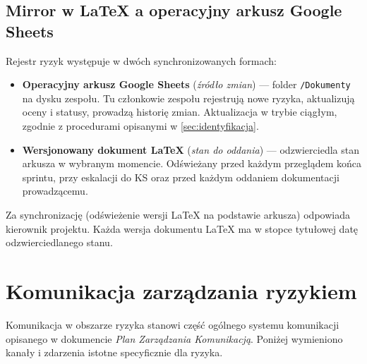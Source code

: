 \documentclass[11pt,a4paper]{article}
\begin{document}
	\subsection{Mirror w \LaTeX{} a operacyjny arkusz Google Sheets}\label{sec:mirror}
	Rejestr ryzyk występuje w dwóch synchronizowanych formach:
	\begin{itemize}[noitemsep]
		\item \textbf{Operacyjny arkusz Google Sheets} (\textit{źródło zmian}) --- folder \texttt{/Dokumenty} na dysku zespołu. Tu członkowie zespołu rejestrują nowe ryzyka, aktualizują oceny i statusy, prowadzą historię zmian. Aktualizacja w trybie ciągłym, zgodnie z procedurami opisanymi w \cref{sec:identyfikacja}.
		\item \textbf{Wersjonowany dokument \LaTeX{}} (\textit{stan do oddania}) --- odzwierciedla stan arkusza w wybranym momencie. Odświeżany przed każdym przeglądem końca sprintu, przy eskalacji do KS oraz przed każdym oddaniem dokumentacji prowadzącemu.
	\end{itemize}
	Za synchronizację (odświeżenie wersji \LaTeX{} na podstawie arkusza) odpowiada kierownik projektu. Każda wersja dokumentu \LaTeX{} ma w stopce tytułowej datę odzwierciedlanego stanu.
	
	\section{Komunikacja zarządzania ryzykiem}\label{sec:komunikacja}
	
	Komunikacja w obszarze ryzyka stanowi część ogólnego systemu komunikacji opisanego w
	dokumencie \textit{Plan Zarządzania Komunikacją}. Poniżej wymieniono kanały i zdarzenia
	istotne specyficznie dla ryzyka.
	
\end{document}

